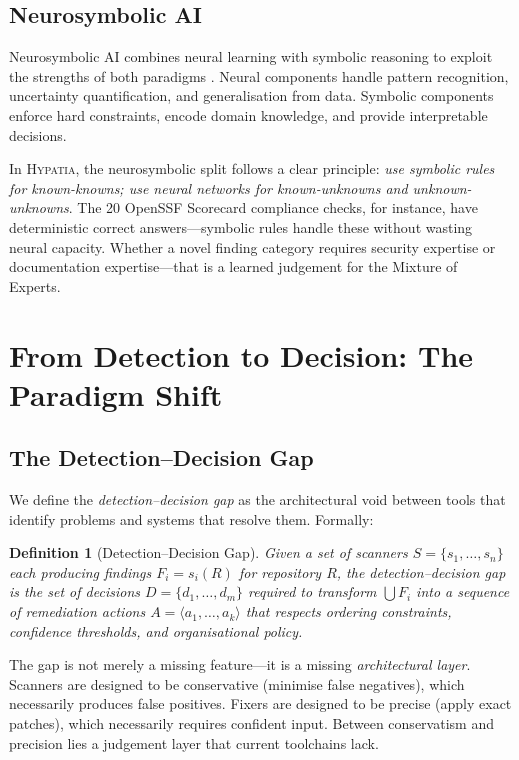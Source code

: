 \documentclass[11pt,a4paper]{article}
\newtheorem{definition}{Definition}
\begin{document}
\subsection{Neurosymbolic AI}

Neurosymbolic AI combines neural learning with symbolic reasoning to exploit the strengths of both paradigms \citep{garcez2019}. Neural components handle pattern recognition, uncertainty quantification, and generalisation from data. Symbolic components enforce hard constraints, encode domain knowledge, and provide interpretable decisions.

In \textsc{Hypatia}, the neurosymbolic split follows a clear principle: \emph{use symbolic rules for known-knowns; use neural networks for known-unknowns and unknown-unknowns}. The 20 OpenSSF Scorecard compliance checks, for instance, have deterministic correct answers---symbolic rules handle these without wasting neural capacity. Whether a novel finding category requires security expertise or documentation expertise---that is a learned judgement for the Mixture of Experts.


\section{From Detection to Decision: The Paradigm Shift}
\label{sec:paradigm}

\subsection{The Detection--Decision Gap}

We define the \emph{detection--decision gap} as the architectural void between tools that identify problems and systems that resolve them. Formally:

\begin{definition}[Detection--Decision Gap]
Given a set of scanners $S = \{s_1, \ldots, s_n\}$ each producing findings $F_i = s_i(R)$ for repository $R$, the detection--decision gap is the set of decisions $D = \{d_1, \ldots, d_m\}$ required to transform $\bigcup F_i$ into a sequence of remediation actions $A = \langle a_1, \ldots, a_k \rangle$ that respects ordering constraints, confidence thresholds, and organisational policy.
\end{definition}

The gap is not merely a missing feature---it is a missing \emph{architectural layer}. Scanners are designed to be conservative (minimise false negatives), which necessarily produces false positives. Fixers are designed to be precise (apply exact patches), which necessarily requires confident input. Between conservatism and precision lies a judgement layer that current toolchains lack.
\end{document}
